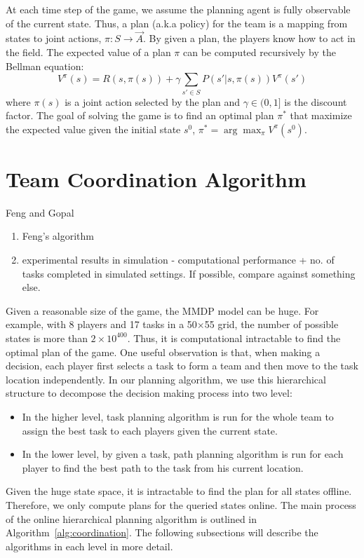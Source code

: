 \documentclass{aamas2014}
\begin{document}
At each time step of the game, we assume the planning agent is
fully observable of the current state. Thus, a plan (a.k.a policy)
for the team is a mapping from states to joint actions, $\pi: S
\rightarrow \vec{A}$. By given a plan, the players know how to act
in the field. The expected value of a plan $\pi$ can be computed
recursively by the Bellman equation:
\begin{equation}
  V^\pi(s) = R(s, \pi(s)) + \gamma \sum_{s'\in S} P(s'|s, \pi(s)) V^\pi(s')
\end{equation}
where $\pi(s)$ is a joint action selected by the plan and $\gamma
\in (0, 1]$ is the discount factor. The goal of solving the game is
to find an optimal plan $\pi^*$ that maximize the expected value
given the initial state $s^0$, $\pi^* = \arg\max_{\pi} V^\pi(s^0)$.

\section{Team Coordination Algorithm}
Feng and Gopal
\begin{enumerate}
\item Feng's algorithm
\item experimental results in simulation - computational performance + no. of tasks completed in simulated settings. If possible, compare against something else.
\end{enumerate}

Given a reasonable size of the game, the MMDP model can be huge.
For example, with 8 players and 17 tasks in a 50$\times$55 grid,
the number of possible states is more than $2\times 10^{400}$.
Thus, it is computational intractable to find the optimal plan of
the game. One useful observation is that, when making a decision,
each player first selects a task to form a team and then move to
the task location independently. In our planning algorithm, we use
this hierarchical structure to decompose the decision making
process into two level:
\begin{itemize}
  \item In the higher level, task planning algorithm is run for
      the whole team to assign the best task to each players
      given the current state.
  \item In the lower level, by given a task, path planning
      algorithm is run for each player to find the best path to
      the task from his current location.
\end{itemize}
Given the huge state space, it is intractable to find the plan for
all states offline. Therefore, we only compute plans for the
queried states online. The main process of the online hierarchical
planning algorithm is outlined in Algorithm~\ref{alg:coordination}.
The following subsections will describe the algorithms in each
level in more detail.
\end{document}
